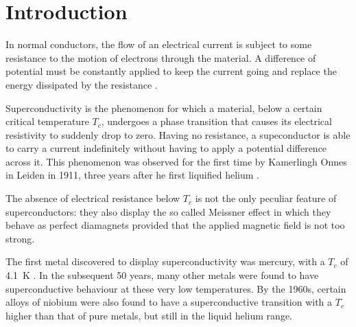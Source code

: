 \documentclass[rmp,10pt,onecolumn,fleqn,notitlepage]{revtex4-1}
\begin{document}
\maketitle


\noindent\makebox[\linewidth]{\color{linescolor} \rule[0.1cm]{0.85\paperwidth}{1pt}}

{
  \hypersetup{linkcolor=black}
  \tableofcontents
}
\noindent\makebox[\linewidth]{\color{linescolor} \rule[-0.2cm]{0.85\paperwidth}{1pt}}
\noindent\makebox[\linewidth]{\color{linescolor} \rule[0.3cm]{0.85\paperwidth}{1.2 pt}}
\pagebreak
\newpage
{}

\section{Introduction}
\label{sec:introduction}

In normal conductors, the flow of an electrical current is subject to some resistance to the motion of electrons through the material. A difference of potential must be constantly applied to keep the current going and replace the energy dissipated by the resistance \cite{sheahen1994introduction}. 

Superconductivity is the phenomenon for which a material, below a certain critical temperature $T_c$, undergoes a phase transition that causes its electrical resistivity to suddenly drop to zero. Having no resistance, a supeconductor is able to carry a current indefinitely without having to apply a potential difference across it. This phenomenon was observed for the first time by Kamerlingh Onnes in Leiden in 1911, three years after he first liquified helium \cite{kittel_2004}. 

The absence of electrical resistance below $T_c$ is not the only peculiar feature of superconductors: they also display the so called Meissner effect in which they behave as perfect diamagnets provided that the applied magnetic field is not too strong.

The first metal discovered to display superconductivity was mercury, with a $T_c$ of \SI{4.1}{\kelvin}  \cite{onnes1911disappearance}. In the subsequent 50 years, many other metals were found to have superconductive behaviour at these very low temperatures. By the 1960s, certain alloys of niobium were also found to have a superconductive transition with a $T_c$ higher than that of pure metals, but still in the liquid helium range. 
\end{document}
